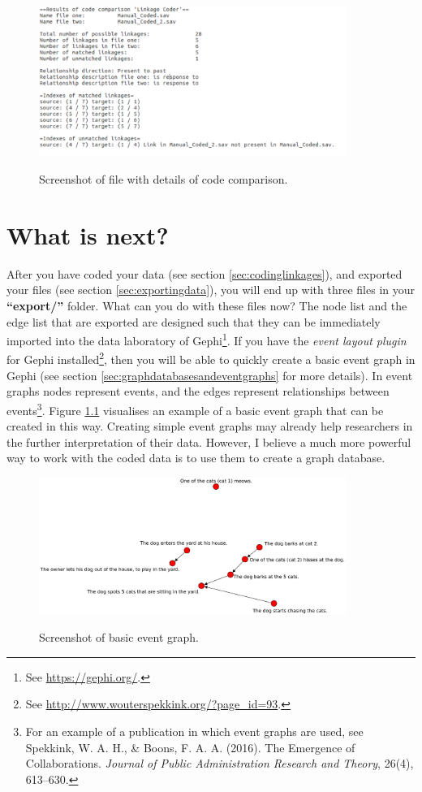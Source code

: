 \documentclass{memoir}
\begin{document}
\begin{figure}[h!]
  \centering
  \caption{Screenshot of file with details of code comparison.}
  \includegraphics[width=100mm]{Screenshot_16.pdf}
  \label{fig:screenshotresults}
\end{figure}

\chapter{What is next?}
\label{chap:whatisnext}

After you have coded your data (see section \ref{sec:codinglinkages}), and exported your files (see section \ref{sec:exportingdata}), you will end up with three files in your \textbf{``export/''} folder. What can you do with these files now? The node list and the edge list that are exported are designed such that they can be immediately imported into the data laboratory of Gephi\footnote{See \url{https://gephi.org/}.}. If you have the \emph{event layout plugin} for Gephi installed\footnote{See \url{http://www.wouterspekkink.org/?page_id=93}.}, then you will be able to quickly create a basic event graph in Gephi (see section \ref{sec:graphdatabasesandeventgraphs} for more details). In event graphs nodes represent events, and the edges represent relationships between events\footnote{For an example of a publication in which event graphs are used, see Spekkink, W. A. H., \& Boons, F. A. A. (2016). The Emergence of Collaborations. \emph{Journal of Public Administration Research and Theory}, 26(4), 613–630.}. Figure \ref{fig:eventgraphone} visualises an example of a basic event graph that can be created in this way. Creating simple event graphs may already help researchers in the further interpretation of their data. However, I believe a much more powerful way to work with the coded data is to use them to create a graph database. 

\begin{figure}[h!]
  \centering
  \caption{Screenshot of basic event graph.}
  \includegraphics[width=100mm]{Diagram_3.pdf}
  \label{fig:eventgraphone}
\end{figure}
\end{document}
